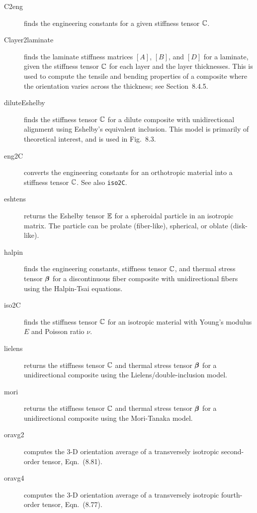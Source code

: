 \documentclass[11pt]{article}
\begin{document}
\begin{description}

    \item[C2eng]{finds the engineering constants for a given stiffness tensor $\mathbb{C}$.}

    \item[Clayer2laminate]{finds the laminate stiffness matrices $[A]$, $[B]$, and $[D]$ for a laminate, given the stiffness tensor $\mathbb{C}$ for each layer and the layer thicknesses.  This is used to compute the tensile and bending properties of a composite where the orientation varies across the thickness; see Section~8.4.5.}
    
    \item[diluteEshelby]{finds the stiffness tensor $\mathbb{C}$ for a dilute composite with unidirectional alignment using Eshelby's equivalent inclusion.  This model is primarily of theoretical interest, and is used in Fig.~8.3.}    
    
    \item[eng2C]{converts the engineering constants for an orthotropic material into a stiffness tensor $\mathbb{C}$.  See also \texttt{iso2C}.}    
    
    \item[eshtens]{returns the Eshelby tensor $\mathbb{E}$ for a spheroidal particle in an isotropic matrix.  The particle can be prolate (fiber-like), spherical, or oblate (disk-like).}
    
    \item[halpin]{finds the engineering constants, stiffness tensor $\mathbb{C}$, and thermal stress tensor $\boldsymbol{\beta}$ for a discontinuous fiber composite with unidirectional fibers using the Halpin-Tsai equations.}    
    
    \item[iso2C]{finds the stiffness tensor $\mathbb{C}$ for an isotropic material with Young's modulus $E$ and Poisson ratio $\nu$.}    
    
    \item[lielens]{returns the stiffness tensor $\mathbb{C}$ and thermal stress tensor $\boldsymbol{\beta}$ for a unidirectional composite using the Lielens/double-inclusion model.}    
    
    \item[mori]{returns the stiffness tensor $\mathbb{C}$ and thermal stress tensor $\boldsymbol{\beta}$ for a unidirectional composite using the Mori-Tanaka model.}   
    
    \item[oravg2]{computes the 3-D orientation average of a transversely isotropic second-order tensor, Eqn.~(8.81).}   
    
    \item[oravg4]{computes the 3-D orientation average of a transversely isotropic fourth-order tensor, Eqn.~(8.77).}   
    
\end{description}
\end{document}
